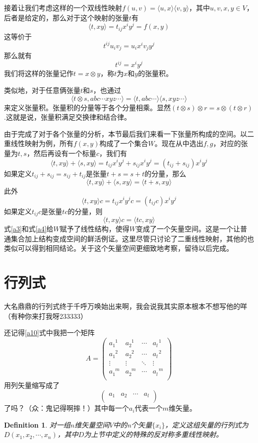 \documentclass[11pt,a4paper,openany]{book}%
\theoremstyle{plain}%
\newtheorem{defi}{Definition}[chapter]%
\begin{document}
接着让我们考虑这样的一个双线性映射$f(u,v)=\langle u, x \rangle\langle v, y \rangle$，其中$u,v,x,y \in V$，后者是给定的，那么对于这个映射的张量$t$有
\[
\langle t,xy\rangle=t_{ij}x^iy^j=f(x,y)
\]
这等价于
\[
t^{ij}u_iv_j=u_ix^iv_jy^j
\]
那么就有
\[
t^{ij}=x^iy^j
\]
我们将这样的张量记作$t=x\otimes y$，称$t$为$x$和$y$的{\kaishu 张量积}。

类似地，对于任意俩张量$t$和$s$，也通过
\[
\langle t\otimes s ,abc\cdots xyz \cdots\rangle=\langle t, abc\cdots \rangle\langle s, xyz \cdots \rangle
\]
来定义张量积。张量积的分量等于各个分量相乘。显然$(t\otimes s)\otimes r=s\otimes (t\otimes r)$.这就是说，张量积满足交换律和结合律。

由于完成了对于各个张量的分析，本节最后我们来看一下张量所构成的空间。以二重线性映射为例，所有$f(x,y)$构成了一个集合$W$。现在从中选出$f,g$，对应的张量为$t,s$，然后再设有一个标量$c$，我们有
\[
\langle t,xy\rangle+\langle s,xy\rangle=t_{ij}x^iy^j+s_{ij}x^iy^j=(t_{ij}+s_{ij})x^iy^j
\]
如果定义$t_{ij}+s_{ij}=s_{ij}+t_{ij}$是张量$t+s=s+t$的分量，那么
\begin{equation}
\label{a3}
\langle t,xy\rangle+\langle s,xy\rangle=\langle t+s,xy\rangle
\end{equation}
此外
\[
\langle t,xy\rangle c=t_{ij}x^iy^jc=(t_{ij}c)x^iy^j
\]
如果定义$t_{ij}c$是张量$tc$的分量，则
\begin{equation}
\label{a4}
\langle t,xy\rangle c=\langle tc,xy\rangle
\end{equation}
式\eqref{a3}和式\eqref{a4}给$W$赋予了线性结构，使得$W$变成了一个矢量空间。这是一个让普通集合加上结构变成空间的鲜活例证。这里尽管只讨论了二重线性映射，其他的也类似可以得到相同结论。关于这个矢量空间更细致地考察，留待以后完成。
\section{行列式}
大名鼎鼎的行列式终于千呼万唤始出来啊，我会说我其实原本根本不想写他的咩（有种你来打我呀233333）

还记得\eqref{a10}式中我把一个矩阵
\[
A=\begin{pmatrix}
a_{1}^{\,\,\,1} & a_{2}^{\,\,\,1} & \cdots & a_{l}^{\,\,\,1}\\
a_{1}^{\,\,\,2} & a_{2}^{\,\,\,2} & \cdots & a_{l}^{\,\,\,2}\\
\vdots & \vdots & \ddots & \vdots \\
a_{1}^{\,\,\,m} & a_{2}^{\,\,\,m} & \cdots & a_{l}^{\,\,\,m}\\
\end{pmatrix}
\]
用列矢量缩写成了
\[
\begin{pmatrix}
a_{1} & a_{2} & \cdots & a_{l}\\
\end{pmatrix}
\]
了吗？（众：鬼记得啊摔！）其中每一个$a_i$代表一个$m$维矢量。
\begin{defi}
对一组$n$维矢量空间$V$中的n个矢量$\{x_i\}$，定义这组矢量的行列式为$D(x_1,x_2,\cdots,x_n)$，其中$D$为上节中定义的特殊的反对称多重线性映射。
\end{defi}
\end{document}
